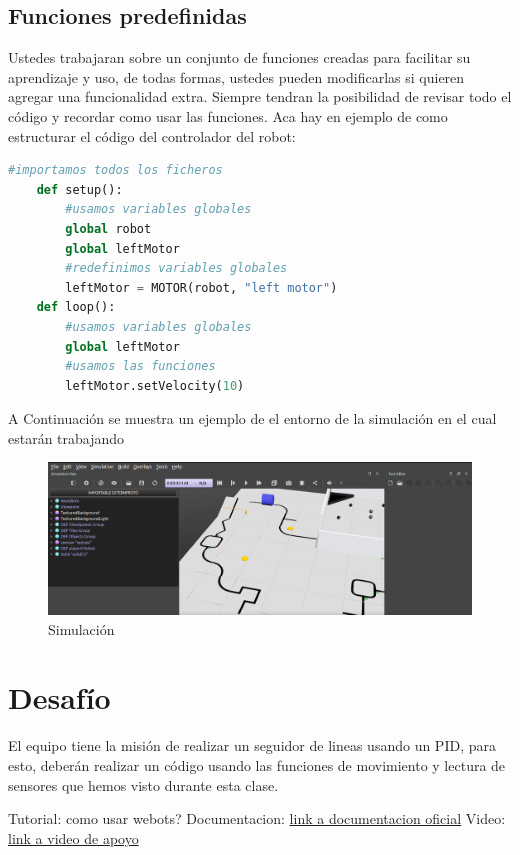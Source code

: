 \documentclass[12pt]{article}
\begin{document}
\subsection{Funciones predefinidas}
Ustedes trabajaran sobre un conjunto de funciones creadas para facilitar su aprendizaje y uso, de todas formas, ustedes pueden modificarlas
si quieren agregar una funcionalidad extra.
Siempre tendran la posibilidad de revisar todo el código y recordar como usar las funciones.
Aca hay en ejemplo de como estructurar el código del controlador del robot:
\begin{lstlisting}[language=Python]
    #importamos todos los ficheros
    def setup():
        #usamos variables globales
        global robot
        global leftMotor
        #redefinimos variables globales
        leftMotor = MOTOR(robot, "left motor")
    def loop():
        #usamos variables globales
        global leftMotor
        #usamos las funciones
        leftMotor.setVelocity(10)
\end{lstlisting}

A Continuación se muestra un ejemplo de el entorno de la simulación en el cual estarán trabajando
\begin{figure}[H]
    \centering
    \includegraphics[width=0.9\textwidth=0.8]{simulacion_imagenes/simulacion_pista.png}
    \caption{Simulación}
    \label{fig:simulacion2}
\end{figure}

\section{Desafío}
El equipo tiene la misión de realizar un seguidor de lineas usando un PID, para esto, deberán realizar un código usando las funciones de movimiento y lectura de sensores que hemos visto durante esta clase.


Tutorial: como usar webots?
Documentacion: \href{https://cyberbotics.com/doc/guide/tutorial-1-your-first-simulation-in-webots?tab-language=python}{link a documentacion oficial}
Video: \href{https://www.youtube.com/watch?v=luyg3plGujg&list=PLbEU0vp_OQkUwANRMUOM00SXybYQ4TXNF}{link a video de apoyo}
\end{document}
